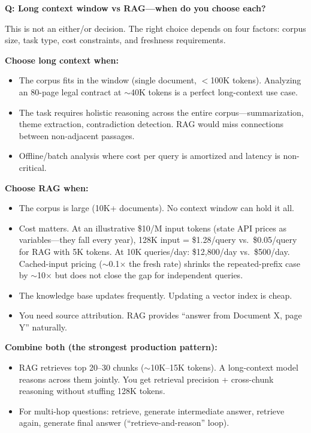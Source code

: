 
\begin{interviewq}
\textbf{Q: Long context window vs RAG---when do you choose each?}

 \quad {} \quad \badgefreq{\freqhigh}

\stronganswer

This is not an either/or decision. The right choice depends on four factors: corpus size, task type, cost constraints, and freshness requirements.

\textbf{Choose long context when:}
\begin{itemize}
    \item The corpus fits in the window (single document, $<$100K tokens). Analyzing an 80-page legal contract at $\sim$40K tokens is a perfect long-context use case.
    \item The task requires holistic reasoning across the entire corpus---summarization, theme extraction, contradiction detection. RAG would miss connections between non-adjacent passages.
    \item Offline/batch analysis where cost per query is amortized and latency is non-critical.
\end{itemize}

\textbf{Choose RAG when:}
\begin{itemize}
    \item The corpus is large (10K+ documents). No context window can hold it all.
    \item Cost matters. At an illustrative \$10/M input tokens (state API prices as variables---they fall every year), 128K input = \$1.28/query vs.\ \$0.05/query for RAG with 5K tokens. At 10K queries/day: \$12,800/day vs.\ \$500/day. Cached-input pricing ($\sim$0.1$\times$ the fresh rate) shrinks the repeated-prefix case by $\sim$10$\times$ but does not close the gap for independent queries.
    \item The knowledge base updates frequently. Updating a vector index is cheap.
    \item You need source attribution. RAG provides ``answer from Document X, page Y'' naturally.
\end{itemize}

\textbf{Combine both (the strongest production pattern):}
\begin{itemize}
    \item RAG retrieves top 20--30 chunks ($\sim$10K--15K tokens). A long-context model reasons across them jointly. You get retrieval precision + cross-chunk reasoning without stuffing 128K tokens.
    \item For multi-hop questions: retrieve, generate intermediate answer, retrieve again, generate final answer (``retrieve-and-reason'' loop).
\end{itemize}


\end{interviewq}
